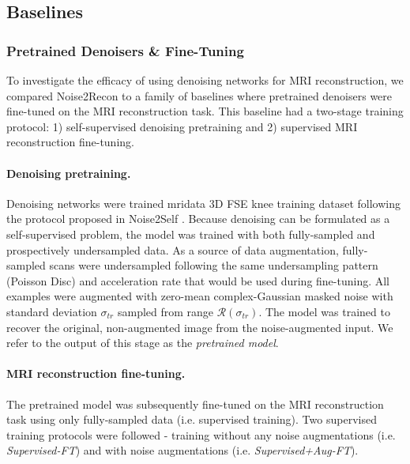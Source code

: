 \documentclass[10pt,twocolumn,letterpaper]{article}
\newcommand{\noiserange}{\mathcal{R}(\sigma_{tr})}
\newcommand{\RV}[1]{{#1}}
\begin{document}
\subsection{Baselines}
\subsubsection{Pretrained Denoisers \& Fine-Tuning}
\label{app:pretrained-denoisers-implementation}
\RV{To investigate the efficacy of using denoising networks for MRI reconstruction, we compared Noise2Recon to a family of baselines where pretrained denoisers were fine-tuned on the MRI reconstruction task. This baseline had a two-stage training protocol: 1) self-supervised denoising pretraining and 2) supervised MRI reconstruction fine-tuning.


\paragraph{Denoising pretraining.} Denoising networks were trained mridata 3D FSE knee training dataset following the protocol proposed in Noise2Self \cite{batson2019noise2self}. Because denoising can be formulated as a self-supervised problem, the model was trained with both fully-sampled and prospectively undersampled data. As a source of data augmentation, fully-sampled scans were undersampled following the same undersampling pattern (Poisson Disc) and acceleration rate that would be used during fine-tuning. All examples were augmented with zero-mean complex-Gaussian masked noise with standard deviation $\sigma_{tr}$ sampled from range $\noiserange$. The model was trained to recover the original, non-augmented image from the noise-augmented input. We refer to the output of this stage as the \textit{pretrained model}. 

\paragraph{MRI reconstruction fine-tuning.} The pretrained model was subsequently fine-tuned on the MRI reconstruction task using only fully-sampled data (i.e. supervised training). Two supervised training protocols were followed - training without any noise augmentations (i.e. \textit{Supervised-FT}) and with noise augmentations (i.e. \textit{Supervised+Aug-FT}).}
\end{document}
